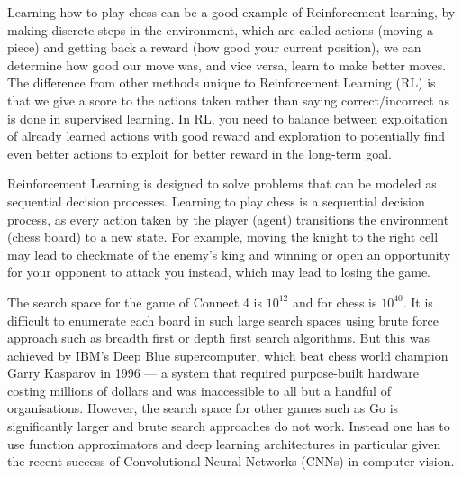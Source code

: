 
Learning how to play chess can be a good example of Reinforcement learning, by making discrete steps in the environment, which are called actions (moving a piece) and getting back a reward (how good your current position), we can determine how good our move was, and vice versa, learn to make better moves. The difference from other methods unique to Reinforcement Learning (RL) is that we give a score to the actions taken rather than saying correct/incorrect as is done in supervised learning. In RL, you need to balance between exploitation of already learned actions with good reward and exploration to potentially find even better actions to exploit for better reward in the long-term goal.

Reinforcement Learning is designed to solve problems that can
be modeled as sequential decision processes. \cite{barto1989learning}
Learning to play chess is a sequential decision process, as every action taken by the player (agent) transitions the environment (chess board) to a new state. For example, moving the knight to the right cell may lead to checkmate of the enemy's king and winning or open an opportunity for your opponent to attack you instead, which may lead to losing the game.



The search space for the game of Connect 4 is $10^{12}$ and for chess is $10^{40}$. It is difficult to enumerate each board in such large search spaces using brute force approach such as breadth first or depth first search algorithms. {\color{red} But this was achieved by IBM’s Deep Blue supercomputer, which beat chess world champion Garry Kasparov in 1996 --- a system that required purpose-built hardware costing millions of dollars and was inaccessible to all but a handful of organisations.} However, the search space for other games such as Go is significantly larger and brute search approaches do not work. Instead one has to use function approximators and deep learning architectures in particular given the recent success of Convolutional Neural Networks (CNNs) in computer vision. 

